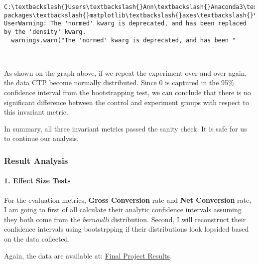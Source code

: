 \documentclass[11pt]{article}
\begin{document}
    \begin{Verbatim}[commandchars=\\\{\}]
C:\textbackslash{}Users\textbackslash{}Ann\textbackslash{}Anaconda3\textbackslash{}lib\textbackslash{}site-packages\textbackslash{}matplotlib\textbackslash{}axes\textbackslash{}\_axes.py:6462: UserWarning: The 'normed' kwarg is deprecated, and has been replaced by the 'density' kwarg.
  warnings.warn("The 'normed' kwarg is deprecated, and has been "

    \end{Verbatim}

    \begin{center}
    \end{center}
    { \hspace*{\fill} \\}
    
    As shown on the graph above, if we repeat the experiment over and over
again, the data CTP become normally distributed. Since 0 is captured in
the 95\% confidence interval from the bootstrapping test, we can
conclude that there is no significant difference between the control and
experiment groups with respect to this invariant metric.

In summary, all three invariant metrics passed the sanity check. It is
safe for us to continue our analysis.

    \subsubsection{Result Analysis}\label{result-analysis}

\paragraph{1. Effect Size Tests}\label{effect-size-tests}

For the evaluation metrics, \textbf{Gross Conversion} rate and
\textbf{Net Conversion} rate, I am going to first of all calculate their
analytic confidence intervals assuming they both come from the
\emph{bernoulli} distribution. Second, I will reconstruct their
confidence intervals using bootstrpping if their distributions look
lopsided based on the data collected.

Again, the data are available at:
\href{https://docs.google.com/spreadsheets/d/1Mu5u9GrybDdska-ljPXyBjTpdZIUev_6i7t4LRDfXM8/edit\#gid=0}{Final
Project Results}.
\end{document}
